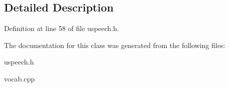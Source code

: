 \subsection{Detailed Description}


Definition at line 58 of file uspeech.\-h.



The documentation for this class was generated from the following files\-:\begin{DoxyCompactItemize}
\item 
uspeech.\-h\item 
vocab.\-cpp\end{DoxyCompactItemize}
